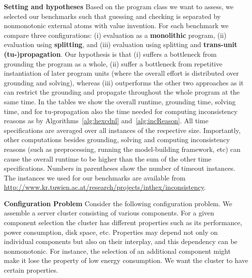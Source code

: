\documentclass[11pt,fleqn,twoside]{article}
\newcommand{\leanparagraph}[1]{\smallskip\noindent\textbf{#1}}
\begin{document}
			\leanparagraph{Setting and hypotheses}
			Based on the program class we want to assess,
			we selected our benchmarks such that guessing and checking
			is separated by nonmonotonic external atoms with value invention.
			For each benchmark we compare three configurations:
			(i) evaluation as a \textbf{monolithic} program,
			(ii) evaluation using \textbf{splitting},
			and (iii) evaluation using splitting and \textbf{trans-unit (tu-)propagation}.
			Our hypothesis is that
			(i) suffers a bottleneck from grounding the program as a whole, (ii) suffer a bottleneck from repetitive instantiation of later program units
			(where the overall effort is distributed over grounding and solving),
			whereas (iii) outperforms the other two approaches as it can restrict the grounding and propagate throughout the whole program at the same time.
			In the tables we show the overall runtime, grounding time, solving time, and for tu-propagation also the time needed for computing inconsistency reasons
			as by Algorithms~\ref{alg:hexcdnl} and~\ref{alg:incReason}.
			All time specifications are averaged over all instances of the respective size.
			Importantly, other computations besides grounding, solving and computing inconsistency reasons
			(such as preprocessing, running the model-building framework, etc)
			can cause the overall runtime to be higher than the sum of the other time specifications.
			Numbers in parentheses show the number of timeout instances.
			The instances we used for our benchmarks are available from \url{http://www.kr.tuwien.ac.at/research/projects/inthex/inconsistency}.

			\leanparagraph{Configuration Problem}
			Consider the following configuration problem.
			We assemble a server cluster consisting of various components. For a given component selection the cluster has different properties
			such as its performance, power consumption, disk space, etc. Properties may depend not only on individual components but also on their interplay,
			and this dependency can be nonmonotonic.
			For instance, the selection of an additional component might make it lose the property of low energy consumption.
			We want the cluster to have certain properties.
\end{document}
